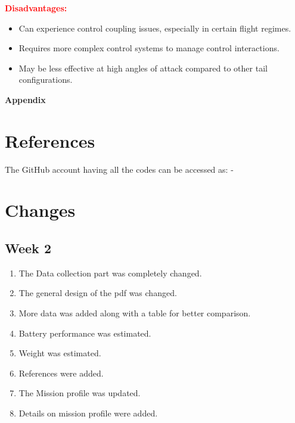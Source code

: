 \documentclass[12 pt]{article}
\begin{document}
{{\textbf{\textcolor{red}{Disadvantages:}}
\begin{itemize}
  \item Can experience control coupling issues, especially in certain flight regimes.
  \item Requires more complex control systems to manage control interactions.
  \item May be less effective at high angles of attack compared to other tail configurations.
\end{itemize}


\vfill

\clearpage

\newpage
\textbf{\Huge{Appendix}}
\appendix


\section{References}

%


\vspace{10 pt}

The GitHub account having all the codes can be accessed as: - 

\href{https://github.com/abhijeetmangela/Group_7_design.git}{}

\newpage

\section{Changes}

\subsection{Week 2}
\begin{enumerate}
    \item The Data collection part was completely changed.
    \item The general design of the pdf was changed.
    \item More data was added along with a table for better comparison.
    \item Battery performance was estimated.
    \item Weight was estimated.
    \item References were added.
    \item The Mission profile was updated.
    \item Details on mission profile were added.
\end{enumerate}

}}
\end{document}
